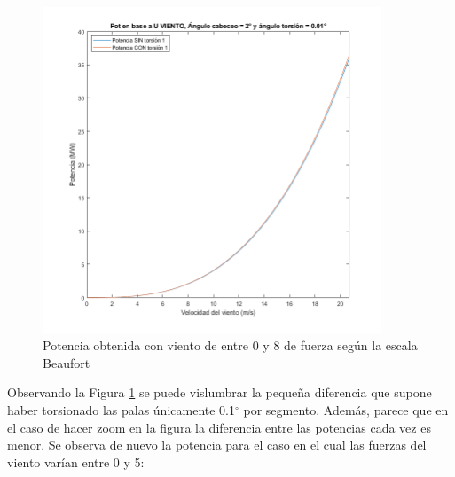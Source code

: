 \begin{figure}[H]
    \centering
    \includegraphics[width=0.9\textwidth]{images/0-8beau torsion.png}
    \caption{Potencia obtenida con viento de entre 0 y 8 de fuerza según la escala Beaufort}
     \label{fig:0-8beaufort_torsion_ejemplo_inicial}
\end{figure}

Observando la Figura \ref{fig:0-8beaufort_torsion_ejemplo_inicial} se puede vislumbrar la pequeña diferencia que supone haber torsionado las palas únicamente 0.1$^{\circ}$ por segmento. Además, parece que en el caso de hacer zoom en la figura la diferencia entre las potencias cada vez es menor. Se observa de nuevo la potencia para el caso en el cual las fuerzas del viento varían entre 0 y 5:

